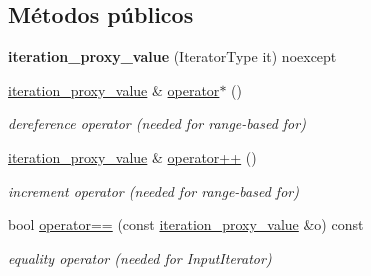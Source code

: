 \subsection*{Métodos públicos}
\begin{DoxyCompactItemize}
\item 
\mbox{\label{classnlohmann_1_1detail_1_1iteration__proxy__value_a459dd8961b80b2089d8161c9aa466581}} 
{\bfseries iteration\+\_\+proxy\+\_\+value} (Iterator\+Type it) noexcept
\item 
\mbox{\label{classnlohmann_1_1detail_1_1iteration__proxy__value_a10accadf05a172fdc69a016bec201e81}} 
\mbox{\hyperlink{classnlohmann_1_1detail_1_1iteration__proxy__value}{iteration\+\_\+proxy\+\_\+value}} \& \mbox{\hyperlink{classnlohmann_1_1detail_1_1iteration__proxy__value_a10accadf05a172fdc69a016bec201e81}{operator$\ast$}} ()
\begin{DoxyCompactList}\small\item\em dereference operator (needed for range-\/based for) \end{DoxyCompactList}\item 
\mbox{\label{classnlohmann_1_1detail_1_1iteration__proxy__value_adf4db2aef31822f3a179435158a4de11}} 
\mbox{\hyperlink{classnlohmann_1_1detail_1_1iteration__proxy__value}{iteration\+\_\+proxy\+\_\+value}} \& \mbox{\hyperlink{classnlohmann_1_1detail_1_1iteration__proxy__value_adf4db2aef31822f3a179435158a4de11}{operator++}} ()
\begin{DoxyCompactList}\small\item\em increment operator (needed for range-\/based for) \end{DoxyCompactList}\item 
\mbox{\label{classnlohmann_1_1detail_1_1iteration__proxy__value_af2b78a8b9c9276b07c928b21bb1e2d54}} 
bool \mbox{\hyperlink{classnlohmann_1_1detail_1_1iteration__proxy__value_af2b78a8b9c9276b07c928b21bb1e2d54}{operator==}} (const \mbox{\hyperlink{classnlohmann_1_1detail_1_1iteration__proxy__value}{iteration\+\_\+proxy\+\_\+value}} \&o) const
\begin{DoxyCompactList}\small\item\em equality operator (needed for Input\+Iterator) \end{DoxyCompactList}\item 

\end{DoxyCompactItemize}
